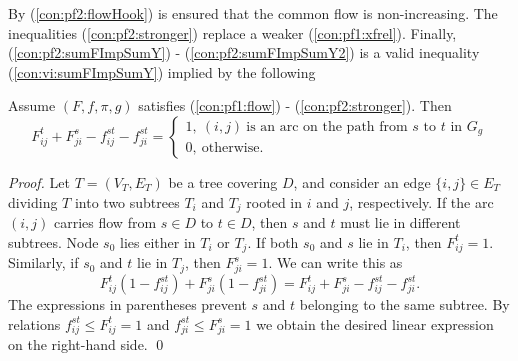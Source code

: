 By (\ref{con:pf2:flowHook}) is ensured that the common flow is non-increasing.
The inequalities (\ref{con:pf2:stronger}) replace a weaker (\ref{con:pf1:xfrel}).
Finally, (\ref{con:pf2:sumFImpSumY}) - (\ref{con:pf2:sumFImpSumY2}) is a valid inequality (\ref{con:vi:sumFImpSumY}) implied by the following
\begin{prop}\label{prop:transX}
Assume $(F,f,\pi,g)$ satisfies (\ref{con:pf1:flow}) - (\ref{con:pf2:stronger}). Then
$$
F^t_{ij}+F^s_{ji}-f^{st}_{ij}-f^{st}_{ji} = 
	\begin{cases}
		1, ~(i,j)~\text{is an arc on the path from~$s$ to $t$ in $G_{g}$} \\
		0, ~\text{otherwise.}
	\end{cases}
$$
\end{prop}
%
\begin{proof}

Let $T=(V_T,E_T)$ be a tree covering $D$, and consider an edge $\{i,j\}\in E_T$ dividing $T$ into two subtrees $T_i$ and $T_j$ rooted in $i$ and $j$, respectively.
If the arc $(i,j)$ carries flow from $s\in D$ to $t\in D$, then $s$ and $t$ must lie in different subtrees.
Node $s_0$ lies either in $T_i$ or $T_j$.
If both $s_0$ and $s$ lie in $T_i$, then $F_{ij}^t=1$.
Similarly, if $s_0$ and $t$ lie in $T_j$, then $F_{ji}^s=1$.
We can write this as
$$
F^t_{ij}(1-f^{st}_{ij})+F^{s}_{ji}(1-f^{st}_{ji})= F^t_{ij}+F^s_{ji} - f^{st}_{ij} - f^{st}_{ji}.
$$
The expressions in parentheses prevent $s$ and $t$ belonging to the same subtree.
By relations $f^{st}_{ij}\leq F_{ij}^t=1$ and $f^{st}_{ji}\leq F_{ji}^s=1$ we obtain the desired linear expression on the right-hand side. 
\qed
\end{proof}
